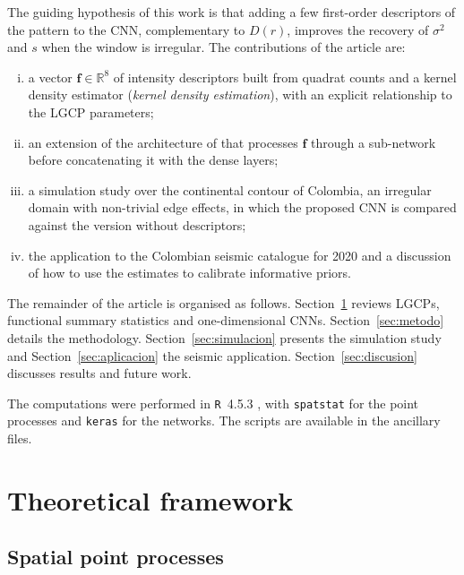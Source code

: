 \documentclass[a4paper,fleqn]{cas-sc}
\numberwithin{equation}{section}
\begin{document}
The guiding hypothesis of this work is that adding a few first-order
descriptors of the pattern to the CNN, complementary to $D(r)$,
improves the recovery of $\sigma^2$ and $s$ when the window is
irregular. The contributions of the article are:
\begin{enumerate}[(i)]
    \item a vector $\mathbf{f}\in\mathbb{R}^{8}$ of intensity
    descriptors built from quadrat counts and a kernel density
    estimator (\textit{kernel density estimation}), with an explicit
    relationship to the LGCP parameters;

    \item an extension of the architecture of \citet{VIHRS2022} that
    processes $\mathbf{f}$ through a sub-network before concatenating
    it with the dense layers;

    \item a simulation study over the continental contour of Colombia,
    an irregular domain with non-trivial edge effects, in which the
    proposed CNN is compared against the version without descriptors;

    \item the application to the Colombian seismic catalogue for 2020
    and a discussion of how to use the estimates to calibrate
    informative priors.
\end{enumerate}

The remainder of the article is organised as follows.
Section~\ref{sec:marco} reviews LGCPs, functional summary statistics
and one-dimensional CNNs. Section~\ref{sec:metodo} details the
methodology. Section~\ref{sec:simulacion} presents the simulation study
and Section~\ref{sec:aplicacion} the seismic application.
Section~\ref{sec:discusion} discusses results and future work.

The computations were performed in \texttt{R}~4.5.3 \citep{R}, with
\texttt{spatstat} \citep{spatstat} for the point processes and
\texttt{keras} \citep{keras_book,keras} for the networks. The scripts
are available in the ancillary files.

\section{Theoretical framework}
\label{sec:marco}

\subsection{Spatial point processes}
\label{sec:pp_theory}
\end{document}
